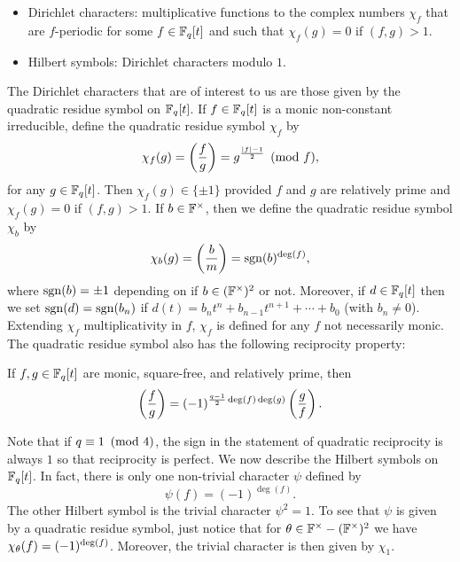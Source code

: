 \documentclass[12pt,reqno,oneside]{amsart}
\begin{document}
        \begin{itemize}
            \item Dirichlet characters: multiplicative functions to the complex numbers $\chi_{f}$ that are $f$-periodic for some $f \in \mathbb{F}_{q}[t]$ and such that $\chi_{f}(g) = 0$ if $(f,g) > 1$.
            \item Hilbert symbols: Dirichlet characters modulo $1$.
        \end{itemize}
        
        The Dirichlet characters that are of interest to us are those given by the quadratic residue symbol on $\mathbb{F}_{q}[t]$. If $f \in \mathbb{F}_{q}[t]$ is a monic non-constant irreducible, define the quadratic residue symbol $\chi_{f}$ by
        \[
            \chi_{f}(g) = \left(\frac{f}{g}\right) = g^{\frac{|f|-1}{2}} \pmod{f},
        \]
        for any $g \in \mathbb{F}_{q}[t]$. Then $\chi_{f}(g) \in \{\pm 1\}$ provided $f$ and $g$ are relatively prime and $\chi_{f}(g) = 0$ if $(f,g) > 1$. If $b \in \mathbb{F}^{\times}$, then we define the quadratic residue symbol $\chi_{b}$ by
        \[
            \chi_{b}(g) = \left(\frac{b}{m}\right) = \operatorname{\mathrm{sgn}}(b)^{\deg(f)},
        \]
        where $\operatorname{\mathrm{sgn}}(b) = \pm1$ depending on if $b \in (\mathbb{F}^{\times})^{2}$ or not. Moreover, if $d \in \mathbb{F}_{q}[t]$ then we set $\operatorname{\mathrm{sgn}}(d) = \operatorname{\mathrm{sgn}}(b_{n})$ if $d(t) = b_{n}t^{n}+b_{n-1}t^{n+1}+\cdots+b_{0}$ (with $b_{n} \neq 0$). Extending $\chi_{f}$ multiplicativity in $f$, $\chi_{f}$ is defined for any $f$ not necessarily monic. The quadratic residue symbol also has the following reciprocity property:

        \begin{theorem}
            If $f,g \in \mathbb{F}_{q}[t]$ are monic, square-free, and relatively prime, then
            \[
                \left(\frac{f}{g}\right) = (-1)^{\frac{q-1}{2}\deg(f)\deg(g)}\left(\frac{g}{f}\right).
            \]
        \end{theorem}

        Note that if $q \equiv 1 \ \left(\text{mod }4\right)$, the sign in the statement of quadratic reciprocity is always $1$ so that reciprocity is perfect. We now describe the Hilbert symbols on $\mathbb{F}_{q}[t]$. In fact, there is only one non-trivial character $\psi$ defined by
        \[
            \psi(f) = (-1)^{\deg(f)}.
        \]
        The other Hilbert symbol is the trivial character $\psi^{2} = 1$. To see that $\psi$ is given by a quadratic residue symbol, just notice that for $\theta \in \mathbb{F}^{\times}-(\mathbb{F}^{\times})^{2}$ we have $\chi_{\theta}(f) = (-1)^{\deg(f)}$. Moreover, the trivial character is then given by $\chi_{1}$.
\end{document}
